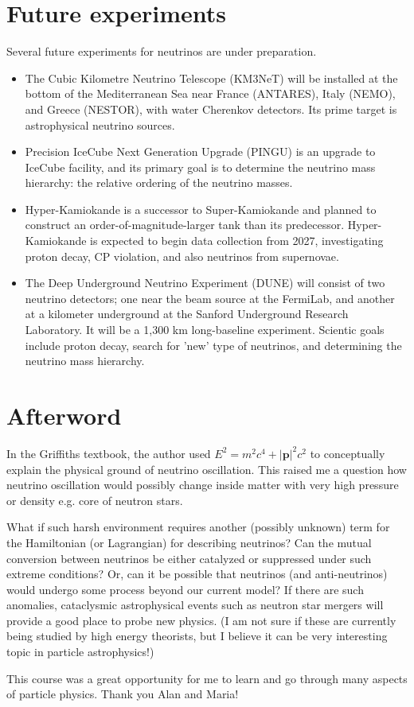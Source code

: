 \documentclass[11pt, oneside]{article}
\begin{document}
\section{Future experiments}

Several future experiments for neutrinos are under preparation.

\begin{itemize}
    \item The Cubic Kilometre Neutrino Telescope (KM3NeT) will be installed at the bottom of the Mediterranean Sea near France (ANTARES), Italy (NEMO), and Greece (NESTOR), with water Cherenkov detectors. Its prime target is astrophysical neutrino sources.
    \item Precision IceCube Next Generation Upgrade (PINGU) is an upgrade to IceCube facility, and its primary goal is to determine the neutrino mass hierarchy: the relative ordering of the neutrino masses.
    \item Hyper-Kamiokande is a successor to Super-Kamiokande and planned to construct an order-of-magnitude-larger tank than its predecessor.
    Hyper-Kamiokande is expected to begin data collection from 2027, investigating proton decay, CP violation, and also neutrinos from supernovae.
    \item The Deep Underground Neutrino Experiment (DUNE) will consist of two neutrino detectors; one near the beam source at the FermiLab, and another at a kilometer underground at the Sanford Underground Research Laboratory. It will be a 1,300 km long-baseline experiment. Scientic goals include proton decay, search for 'new' type of neutrinos, and determining the neutrino mass hierarchy.
\end{itemize}


\vspace{1em}
\section*{Afterword}
In the Griffiths textbook, the author used $E^2 = m^2 c^4 + |\mathbf{p}|^2c^2$ to conceptually explain the physical ground of neutrino oscillation.
This raised me a question how neutrino oscillation would possibly change inside matter with very high pressure or density e.g. core of neutron stars.

What if such harsh environment requires another (possibly unknown) term for the Hamiltonian (or Lagrangian) for describing neutrinos?
Can the mutual conversion between neutrinos be either catalyzed or suppressed under such extreme conditions? Or, can it be possible that neutrinos (and anti-neutrinos) would undergo some process beyond our current model? If there are such anomalies, cataclysmic astrophysical events such as neutron star mergers will provide a good place to probe new physics.
(I am not sure if these are currently being studied by high energy theorists, but I believe it can be very interesting topic in particle astrophysics!)



\vspace{2em}
This course was a great opportunity for me to learn and go through many aspects of particle physics. Thank you Alan and Maria!



\vfill
\nocite{*}
% 


\end{document}
